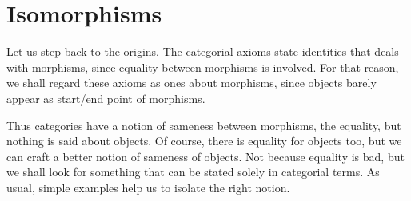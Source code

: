
\section{Isomorphisms}


Let us step back to the origins. The categorial axioms state
identities that deals with morphisms, since equality between morphisms
is involved. For that reason, we shall regard these axioms as ones
about morphisms, since objects barely appear as start/end point of
morphisms.

Thus categories have a notion of sameness between morphisms, the
equality, but nothing is said about objects. Of course, there is
equality for objects too, but we can craft a better notion of sameness
of objects. Not because equality is bad, but we shall look for
something that can be stated solely in categorial terms. As usual,
simple examples help us to isolate the right notion.

%

